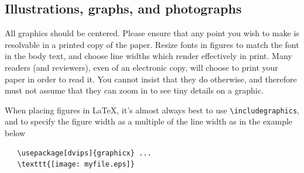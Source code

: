 \documentclass[10pt,twocolumn,letterpaper]{article}
\begin{document}
\subsection{Illustrations, graphs, and photographs}

All graphics should be centered.  Please ensure that any point you wish to
make is resolvable in a printed copy of the paper.  Resize fonts in figures
to match the font in the body text, and choose line widths which render
effectively in print.  Many readers (and reviewers), even of an electronic
copy, will choose to print your paper in order to read it.  You cannot
insist that they do otherwise, and therefore must not assume that they can
zoom in to see tiny details on a graphic.

When placing figures in \LaTeX, it's almost always best to use
\verb+\includegraphics+, and to specify the  figure width as a multiple of
the line width as in the example below
{\small\begin{verbatim}
   \usepackage[dvips]{graphicx} ...
   \texttt{[image: myfile.eps]}
\end{verbatim}
}


{\small


}
\end{document}
